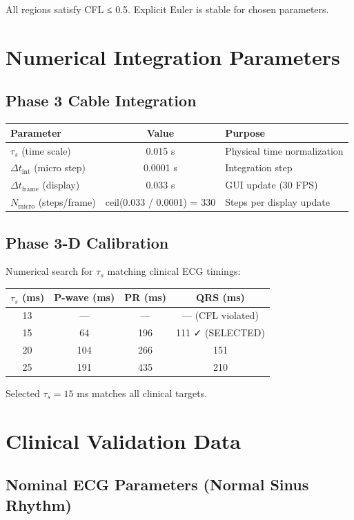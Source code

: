 \documentclass[11pt, a4paper]{article}
\begin{document}
All regions satisfy CFL ≤ 0.5. Explicit Euler is stable for chosen parameters.

\section{Numerical Integration Parameters}

\subsection{Phase 3 Cable Integration}

\begin{tabularx}{\textwidth}{|l|c|l|}
\hline
\textbf{Parameter} & \textbf{Value} & \textbf{Purpose} \\
\hline
$\tau_s$ (time scale) & 0.015 s & Physical time normalization \\
$\Delta t_{\text{int}}$ (micro step) & 0.0001 s & Integration step \\
$\Delta t_{\text{frame}}$ (display) & 0.033 s & GUI update (30 FPS) \\
$N_{\text{micro}}$ (steps/frame) & ceil(0.033 / 0.0001) = 330 & Steps per display update \\
\hline
\end{tabularx}

\subsection{Phase 3-D Calibration}

Numerical search for $\tau_s$ matching clinical ECG timings:

\begin{tabularx}{\textwidth}{|c|c|c|c|}
\hline
$\tau_s$ (ms) & P-wave (ms) & PR (ms) & QRS (ms) \\
\hline
13 & — & — & — (CFL violated) \\
15 & 64 & 196 & 111 ✓ (SELECTED) \\
20 & 104 & 266 & 151 \\
25 & 191 & 435 & 210 \\
\hline
\end{tabularx}

Selected $\tau_s = 15$ ms matches all clinical targets.

\section{Clinical Validation Data}

\subsection{Nominal ECG Parameters (Normal Sinus Rhythm)}
\end{document}
